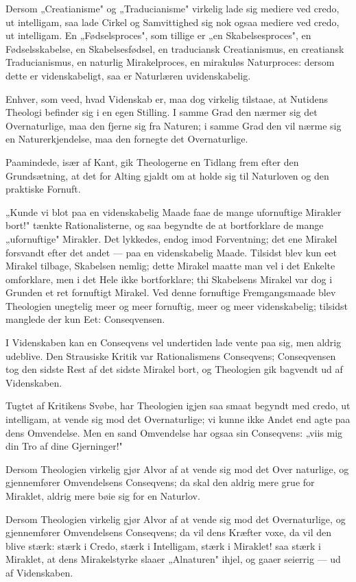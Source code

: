 \documentclass[12pt,a4paper]{article}
\newcommand{\opage}[1]{\marginnote{\footnotesize\textit{[#1]}}}
\begin{document}
Dersom „Creatianisme" og „Traducianisme" virkelig lade sig mediere ved credo, ut
intelligam, saa lade Cirkel og Samvittighed sig nok ogsaa
\opage{36} mediere ved credo, ut intelligam. En „Fødselsproces", som tillige er „en
Skabelsesproces", en Fødselsskabelse, en Skabelsesfødsel, en traduciansk
Creatianismus, en creatiansk Traducianismus, en naturlig Mirakelproces, en
mirakuløs Naturproces: dersom dette er videnskabeligt, saa er Naturlæren
uvidenskabelig.

Enhver, som veed, hvad Videnskab er, maa dog virkelig tilstaae, at Nutidens
Theologi befinder sig i en egen Stilling. I samme Grad den nærmer sig det
Overnaturlige, maa den fjerne sig fra Naturen; i samme Grad den vil nærme sig en
Naturerkjendelse, maa den fornegte det Overnaturlige.

Paamindede, især af Kant, gik Theologerne en Tidlang frem efter den Grundsætning,
at det for Alting gjaldt om at holde sig til Naturloven og den praktiske Fornuft.

„Kunde vi blot paa en videnskabelig Maade faae de mange ufornuftige Mirakler
bort!" tænkte Rationalisterne, og saa begyndte de at bortforklare de mange
„ufornuftige" Mirakler. Det lykkedes, endog imod Forventning; det ene Mirakel
forsvandt efter det andet --- paa en videnskabelig Maade. Tilsidst blev kun eet
Mirakel tilbage, Skabelsen nemlig; dette Mirakel maatte man vel i det Enkelte
omforklare, men i det Hele ikke bortforklare; thi Skabelsens Mirakel var dog i
Grunden et ret fornuftigt Mirakel. Ved denne fornuftige Fremgangsmaade blev
Theologien unegtelig meer og meer fornuftig, meer og meer videnskabelig; tilsidst
manglede der kun Eet: Conseqvensen.

I Videnskaben kan en Conseqvens vel undertiden lade vente paa sig, men aldrig
udeblive. Den Strausiske Kritik var Rationalismens Conseqvens; Conseqvensen tog
den sidste Rest af det sidste Mirakel bort, og Theologien gik bagvendt ud af
Videnskaben.

Tugtet af Kritikens Svøbe, har Theologien igjen saa smaat begyndt med credo, ut
intelligam, at vende sig mod det Overnaturlige; vi kunne ikke Andet end agte paa
dens Omvendelse. Men en sand Omvendelse har ogsaa sin Conseqvens: „viis mig din
Tro af dine Gjerninger!"

Dersom Theologien virkelig gjør Alvor af at vende sig mod det Over%
\opage{37}naturlige, og gjennemfører Omvendelsens Conseqvens; da skal den aldrig mere grue
for Miraklet, aldrig mere bøie sig for en Naturlov.

Dersom Theologien virkelig gjør Alvor af at vende sig mod det Overnaturlige, og
gjennemfører Omvendelsens Conseqvens; da vil dens Kræfter voxe, da vil den blive
stærk: stærk i Credo, stærk i Intelligam, stærk i Miraklet! saa stærk i Miraklet,
at dens Mirakelstyrke slaaer „Alnaturen" ihjel, og gaaer seierrig --- ud af
Videnskaben.
\end{document}
